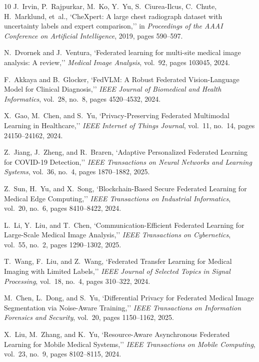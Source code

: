 \documentclass[conference]{IEEEtran}
\begin{document}
\begin{thebibliography}{10}
J.~Irvin, P.~Rajpurkar, M.~Ko, Y.~Yu, S.~Ciurea-Ilcus, C.~Chute, H.~Marklund, et~al.,
`CheXpert: A large chest radiograph dataset with uncertainty labels and expert comparison,''
in \emph{Proceedings of the AAAI Conference on Artificial Intelligence}, 2019, pages 590--597.

N.~Dvornek and J.~Ventura,
`Federated learning for multi-site medical image analysis: A review,''
\emph{Medical Image Analysis}, vol.\ 92, pages 103045, 2024.

F.~Akkaya and B.~Glocker,
`FedVLM: A Robust Federated Vision-Language Model for Clinical Diagnosis,''
\emph{IEEE Journal of Biomedical and Health Informatics}, vol.\ 28, no.\ 8, pages 4520--4532, 2024.

X.~Gao, M.~Chen, and S.~Yu,
`Privacy-Preserving Federated Multimodal Learning in Healthcare,''
\emph{IEEE Internet of Things Journal}, vol.\ 11, no.\ 14, pages 24150--24162, 2024.

Z.~Jiang, J.~Zheng, and R.~Braren,
`Adaptive Personalized Federated Learning for COVID-19 Detection,''
\emph{IEEE Transactions on Neural Networks and Learning Systems}, vol.\ 36, no.\ 4, pages 1870--1882, 2025.

Z.~Sun, H.~Yu, and X.~Song,
`Blockchain-Based Secure Federated Learning for Medical Edge Computing,''
\emph{IEEE Transactions on Industrial Informatics}, vol.\ 20, no.\ 6, pages 8410--8422, 2024.

L.~Li, Y.~Liu, and T.~Chen,
`Communication-Efficient Federated Learning for Large-Scale Medical Image Analysis,''
\emph{IEEE Transactions on Cybernetics}, vol.\ 55, no.\ 2, pages 1290--1302, 2025.

T.~Wang, F.~Liu, and Z.~Wang,
`Federated Transfer Learning for Medical Imaging with Limited Labels,''
\emph{IEEE Journal of Selected Topics in Signal Processing}, vol.\ 18, no.\ 4, pages 310--322, 2024.

M.~Chen, L.~Dong, and S.~Yu,
`Differential Privacy for Federated Medical Image Segmentation via Noise-Aware Training,''
\emph{IEEE Transactions on Information Forensics and Security}, vol.\ 20, pages 1150--1162, 2025.

X.~Liu, M.~Zhang, and K.~Yu,
`Resource-Aware Asynchronous Federated Learning for Mobile Medical Systems,''
\emph{IEEE Transactions on Mobile Computing}, vol.\ 23, no.\ 9, pages 8102--8115, 2024.


\end{thebibliography}
\end{document}
